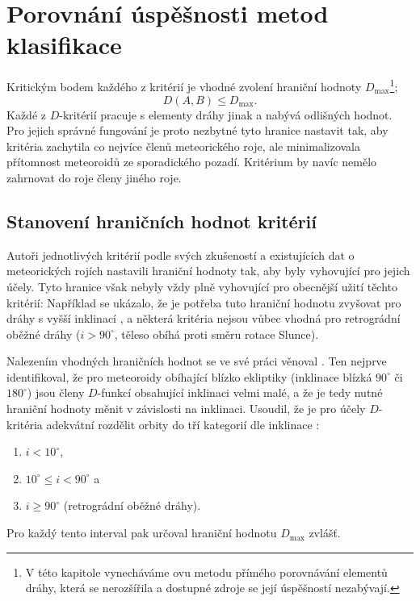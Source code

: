 \chapter{Porovnání úspěšnosti metod klasifikace\label{cpt:compare}}%
Kritickým bodem každého z kritérií je vhodné zvolení hraniční hodnoty $D_\text{max}$\footnote{V této kapitole vynecháváme \citeauthor{radiosurvey}ovu metodu přímého porovnávání elementů dráhy, která se nerozšířila a dostupné zdroje se její úspěšností nezabývají.};
$$
    D(A,B)\le D_\text{max}\text{.}
$$
Každé z $D$-kritérií pracuje s elementy dráhy jinak a nabývá odlišných hodnot. Pro jejich správné fungování je proto nezbytné tyto hranice nastavit tak, aby kritéria zachytila co nejvíce členů meteorického roje, ale minimalizovala přítomnost meteoroidů ze sporadického pozadí. Kritérium by navíc nemělo zahrnovat do roje členy jiného roje.

\section{Stanovení hraničních hodnot kritérií}%

Autoři jednotlivých kritérií podle svých zkušeností a existujících dat o meteorických rojích nastavili hraniční hodnoty tak, aby byly vyhovující pro jejich účely. Tyto hranice však nebyly vždy plně vyhovující pro obecnější užití těchto kritérií: Například se ukázalo, že je potřeba tuto hraniční hodnotu zvyšovat pro dráhy s vyšší inklinací \cite{galligan}, a některá kritéria nejsou vůbec vhodná pro retrográdní oběžné dráhy \cite{galligan} ($i>90^\circ$, těleso obíhá proti směru rotace Slunce).

\medskip

Nalezením vhodných hraničních hodnot se ve své práci \cite{galligan} věnoval \citeauthor{galligan}. Ten nejprve identifikoval, že pro meteoroidy obíhající blízko ekliptiky (inklinace blízká $90^\circ$ či $180^\circ$) jsou členy $D$-funkcí obsahující inklinaci velmi malé, a že je tedy nutné hraniční hodnoty měnit v závislosti na inklinaci. Usoudil, že je pro účely $D$-kritéria adekvátní rozdělit orbity do tří kategorií dle inklinace \cite{galligan}:
\begin{enumerate}
    \item \hspace{1cm} $i < 10^\circ$,
    \item \hspace{1cm} $10^\circ \le i < 90^\circ$ a
    \item \hspace{1cm} $i \ge 90^\circ$ (retrográdní oběžné dráhy).
\end{enumerate}
Pro každý tento interval pak určoval hraniční hodnotu $D_\text{max}$ zvlášť.

